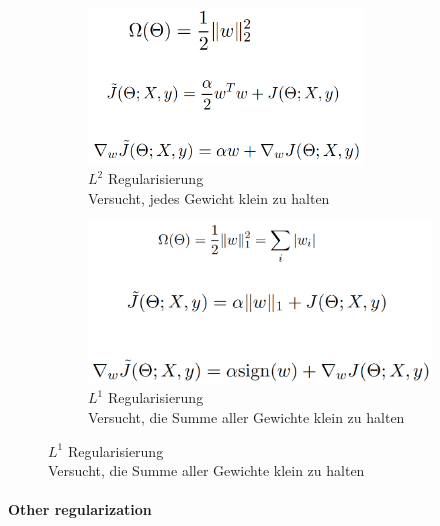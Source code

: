 \documentclass[a4paper]{article}
\begin{document}
		\begin{figure}[htb!]
			\centering
			\begin{subfigure}[b]{0.475\textwidth}
				\centering
				\includegraphics[width=0.8\textwidth]{img/06_deep_nn/l2_regularization.png}
				\caption{$L^2$ Regularisierung \\ Versucht, jedes Gewicht klein zu halten}
			\end{subfigure}
			\hfill
			\begin{subfigure}[b]{0.475\textwidth}
				\centering
				\includegraphics[width=\textwidth]{img/06_deep_nn/l1_regularization.png}
				\caption{$L^1$ Regularisierung \\ Versucht, die Summe aller Gewichte klein zu halten}
			\end{subfigure}
		\end{figure}
	
		\newpage
	
		\paragraph{Other regularization}
		
\end{document}
